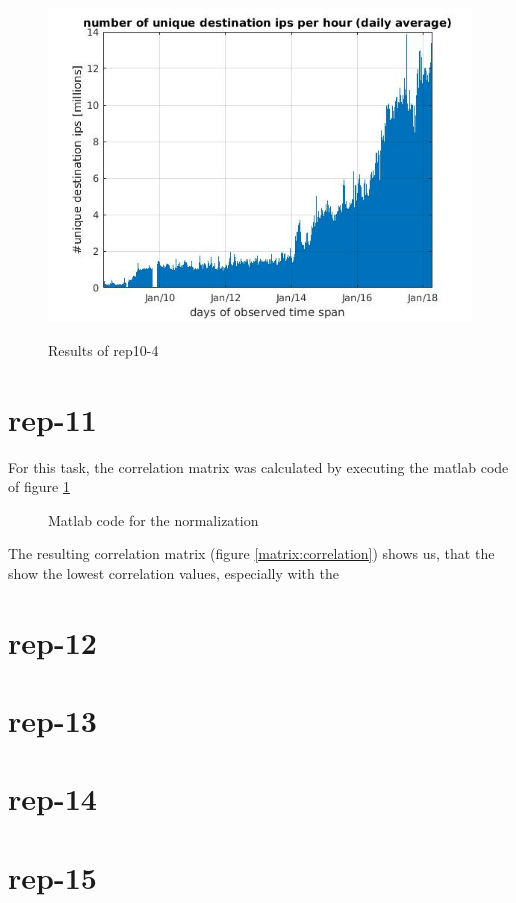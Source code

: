 \begin{figure}[H]
\center
\includegraphics[width=.7\textwidth]{./chapters/plots/rep10_4.jpg}\\
\caption{Results of rep10-4}
\end{figure}

\section*{rep-11}
For this task, the correlation matrix was calculated by executing the matlab code of figure \ref{fig:correlation}
\begin{figure}[H]

\caption{Matlab code for the normalization}
\label{fig:correlation}
\end{figure}
The resulting correlation matrix (figure \ref{matrix:correlation}) shows us, that the  show the lowest correlation values, especially with the 


\section*{rep-12}

\section*{rep-13}

\section*{rep-14}

\section*{rep-15}

